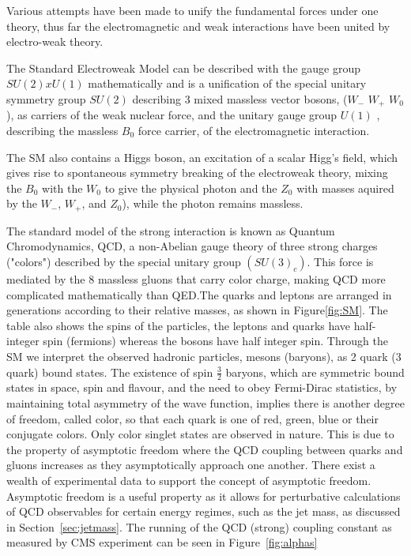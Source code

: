 Various attempts have been made to unify the fundamental forces under one theory, thus far the electromagnetic and weak interactions have been united by electro-weak theory. 

The Standard Electroweak Model can be described with the gauge group $SU(2) x U(1)$ mathematically and is a unification of the special unitary symmetry group $SU(2)$ describing 3 mixed massless vector bosons, ($W_{-}$ $W_{+}$ $W_0$), as carriers of the weak nuclear force, and the unitary gauge group $U(1)$ , describing the massless $B_0$ force carrier, of the electromagnetic interaction.

The SM also contains a Higgs boson, an excitation of a scalar Higg's field, which gives rise to spontaneous symmetry breaking of the electroweak theory, mixing the $B_0$ with the $W_0$ to give the physical photon and the $Z_0$ with masses aquired by the $W_{-}$, $W_{+}$, and $Z_0$), while the photon remains massless.



The standard model of the strong interaction is known as Quantum Chromodynamics, QCD, a non-Abelian gauge theory of three strong charges ("colors") described by the special unitary group $(SU(3)_c)$. This force is mediated by the 8 massless gluons that carry color charge, making QCD more complicated mathematically than QED.The quarks and leptons are arranged in generations according to their relative masses, as shown in Figure\ref{fig:SM}. The table also shows the spins of the particles, the leptons and quarks have half-integer spin (fermions) whereas the bosons have half integer spin. Through the SM we interpret the observed hadronic particles, mesons (baryons), as 2 quark (3 quark) bound states. The existence of spin $\frac{3}{2}$ baryons, which are symmetric bound states in space, spin and flavour, and the need to obey Fermi-Dirac statistics, by maintaining total asymmetry of the wave function, implies there is another degree of freedom, called color, so that each quark is one of red, green, blue or their conjugate colors. Only color singlet states are observed in nature. This is due to the property of asymptotic freedom where the QCD coupling between quarks and gluons increases as they asymptotically approach one another. There exist a wealth of experimental data to support the concept of asymptotic freedom. Asymptotic freedom is a useful property as it allows for perturbative calculations of QCD observables for certain energy regimes, such as the jet mass, as discussed in Section~\ref{sec:jetmass}. The running of the QCD (strong) coupling constant as measured by CMS experiment can be seen in Figure~\ref{fig:alphas}


